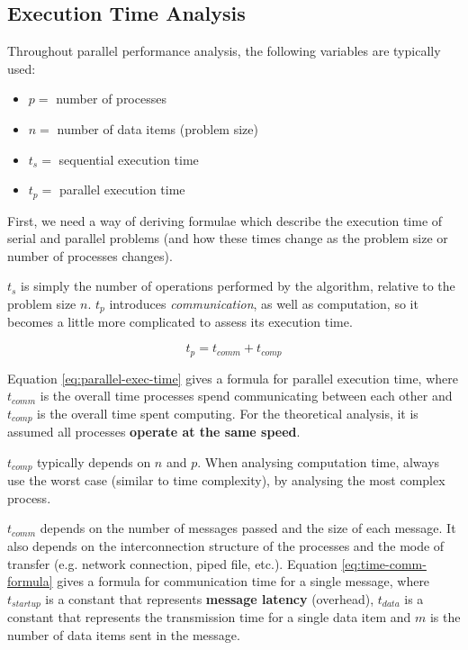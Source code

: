 \documentclass{article}
\begin{document}
\subsection{Execution Time Analysis}
\label{sec:exec-time-analysis}

Throughout parallel performance analysis, the following variables are typically used:
\begin{itemize}
	\item $p= $ number of processes
	\item $n= $ number of data items (problem size)
	\item $t_s= $ sequential execution time
	\item $t_p= $ parallel execution time
\end{itemize}

First, we need a way of deriving formulae which describe the execution time of serial and parallel problems (and how these times change as the problem size or number of processes changes).

$t_s$ is simply the number of operations performed by the algorithm, relative to the problem size $n$. $t_p$ introduces \textit{communication}, as well as computation, so it becomes a little more complicated to assess its execution time.

\begin{equation}
	t_p = t_{comm} + t_{comp}
	\label{eq:parallel-exec-time}
\end{equation}

Equation \ref{eq:parallel-exec-time} gives a formula for parallel execution time, where $t_{comm}$ is the overall time processes spend communicating between each other and $t_{comp}$ is the overall time spent computing. For the theoretical analysis, it is assumed all processes \textbf{operate at the same speed}.

$t_{comp}$ typically depends on $n$ and $p$. When analysing computation time, always use the worst case (similar to time complexity), by analysing the most complex process. 

$t_{comm}$ depends on the number of messages passed and the size of each message. It also depends on the interconnection structure of the processes and the mode of transfer (e.g. network connection, piped file, etc.). Equation \ref{eq:time-comm-formula} gives a formula for communication time for a single message, where $t_{startup}$ is a constant that represents \textbf{message latency} (overhead), $t_{data}$ is a constant that represents the transmission time for a single data item and $m$ is the number of data items sent in the message.
\end{document}
